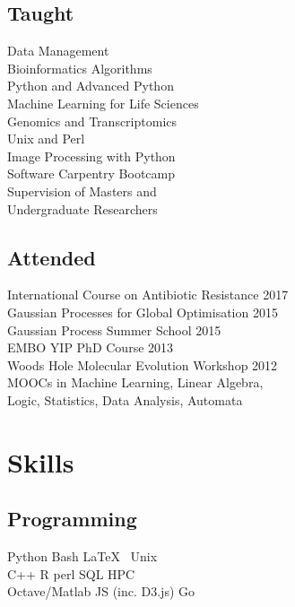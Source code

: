 \documentclass[]{Finlay_Maguire_CV}
\begin{document}
\begin{minipage}[t]{0.33\textwidth}
\subsection{Taught}
Data Management\\
Bioinformatics Algorithms\\
Python and Advanced Python\\
Machine Learning for Life Sciences\\
Genomics and Transcriptomics\\
Unix and Perl\\
Image Processing with Python\\
Software Carpentry Bootcamp\\
Supervision of Masters and \\ Undergraduate Researchers\\
\sectionsep

\subsection{Attended}
International Course on Antibiotic Resistance 2017 \\
Gaussian Processes for Global Optimisation 2015\\
Gaussian Process Summer School 2015\\
EMBO YIP PhD Course 2013\\
Woods Hole Molecular Evolution Workshop 2012\\
MOOCs in Machine Learning, Linear Algebra, \\
Logic, Statistics, Data Analysis, Automata \\
\sectionsep


\section{Skills}
\subsection{Programming}
    \textit{}
    Python \textbullet{} Bash \textbullet{}  \LaTeX\ \textbullet{} Unix\\
    \textit{}
    C++ \textbullet{} R \textbullet{} perl \textbullet{} SQL \textbullet{} HPC\\
    \textit{}
    Octave/Matlab \textbullet{} JS (inc. D3.js) \textbullet{} Go\\
\sectionsep

\end{minipage}
\end{document}
